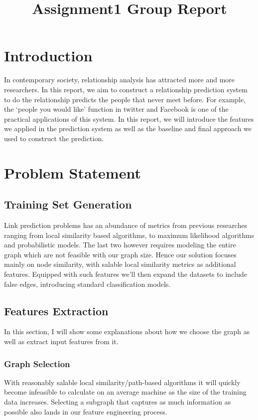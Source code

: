 \documentclass[a4paper,11pt]{article}
\title{Assignment1 Group Report}
\begin{document}
\maketitle

\section{Introduction}

In contemporary society, relationship analysis has attracted more and more researchers. In this report, we aim to construct a relationship prediction system to do the relationship predicts the people that never meet before. For example, the ‘people you would like’ function in twitter and Facebook is one of the practical applications of this system. In this report, we will introduce the features we applied in the prediction system as well as the baseline and final approach we used to construct the prediction.

\section{Problem Statement}
\subsection{Training Set Generation}
Link prediction problems has an abundance of metrics from previous researches ranging from local similarity based algorithms, to maximum likelihood algorithms and probabilistic models. The last two however requires modeling the entire graph which are not feasible with our graph size. Hence our solution focuses mainly on node similarity, with salable local similarity metrics as additional features. Equipped with such features we’ll then expand the datasets to include false edges, introducing standard classification models.

\subsection{Features Extraction}
In this section, I will show some explanations about how we choose the graph as well as extract input features from it. 
\subsubsection{Graph Selection}
With reasonably salable local similarity/path-based algorithms it will quickly become infeasible to calculate on an average machine as the size of the training data increases. Selecting a subgraph that captures as much information as possible also lands in our feature engineering process.
\end{document}
